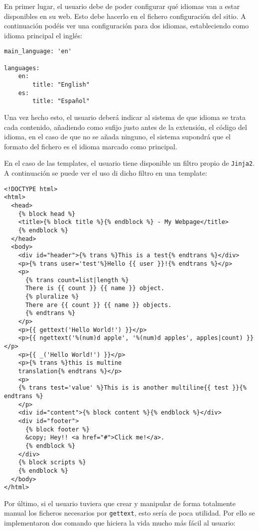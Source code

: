 En primer lugar, el usuario debe de poder configurar qué idiomas van a estar disponibles en su web. Esto debe hacerlo
en el fichero configuración del sitio. A continuación podéis ver una configuración para dos idiomas, estableciendo como
idioma principal el inglés:

\begin{verbatim}
main_language: 'en'

languages:
    en:
		title: "English"
    es:
		title: "Español"
\end{verbatim}

Una vez hecho esto, el usuario deberá indicar al sistema de que idioma se trata cada contenido, añadiendo como sufijo
justo antes de la extensión, el código del idioma, en el caso de que no se añada ninguno, el sistema supondrá que
el formato del fichero es el idioma marcado como principal.

En el caso de las templates, el usuario tiene disponible un filtro propio de \texttt{Jinja2}. A continuación
se puede ver el uso di dicho filtro en una template:

\begin{verbatim}
<!DOCTYPE html>
<html>
  <head>
    {% block head %}
    <title>{% block title %}{% endblock %} - My Webpage</title>
    {% endblock %}
  </head>
  <body>
    <div id="header">{% trans %}This is a test{% endtrans %}</div>
    <p>{% trans user='test'%}Hello {{ user }}!{% endtrans %}</p>
    <p>
      {% trans count=list|length %}
      There is {{ count }} {{ name }} object.
      {% pluralize %}
      There are {{ count }} {{ name }} objects.
      {% endtrans %}
    </p>
    <p>{{ gettext('Hello World!') }}</p>
    <p>{{ ngettext('%(num)d apple', '%(num)d apples', apples|count) }}</p>
    <p>{{ _('Hello World!') }}</p>
    <p>{% trans %}this is multine
    translation{% endtrans %}</p>
    <p>
    {% trans test='value' %}This is is another multiline{{ test }}{% endtrans %}
    </p>
    <div id="content">{% block content %}{% endblock %}</div>
    <div id="footer">
      {% block footer %}
      &copy; Hey!! <a href="#">Click me!</a>.
      {% endblock %}
    </div>
    {% block scripts %}
    {% endblock %}
  </body>
</html>
\end{verbatim}

Por último, si el usuario tuviera que crear y manipular de forma totalmente manual los ficheros
necesarios por \texttt{gettext}, esto sería de poca utilidad. Por ello se implementaron dos comando
que hiciera la vida mucho más fácil al usuario:


